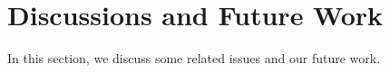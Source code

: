 \section{Discussions and Future Work}
\label{sec:discussion}

In this section, we discuss some related issues and our future work.

\begin{comment}
\vspace{1mm}\noindent{\textbf{Scalability.}} The adversary cannot exhaust $ID_{RP}$ and $PID_{RP}$.
For $ID_{RP}$, it is generated only in RP's initial registration.
For $PID_{RP}$,  in practice, we only need to ensure all $PID_{RP}$s are different among the unexpired identity proof (the number denoted as $a$). We assume that IdP doesn't perform the uniqueness check, and then calculate the probability that at least two $PID_{RP}$s are equal in these $a$ ones. The probability is $1-\prod_{i=0}^{a-1}(1-i/q)$ which increases with $a$.
For an IdP with throughput $2*10^8$ req/s, when the validity period of the identity proof ($PID_{RP}$) is set as 5 minutes, $a$ is less than $2^{36}$, then the probability is less than $2^{-183}$ for 256-bit $q$ (the order of base point $G$ on $P-256$).
Moreover, as this probability is negligible, the uniqueness check of $PID_{RP}$, i.e., the $PID_{RP}$ registration, could be removed in the SSO login process, and this optimization can be adopted when this negligible probability is acceptable by the users and RPs.

\noindent{\textbf{Security against DoS attack.}}
The adversary may attempt to perform DoS attack on the IdP and RP. For example, the adversary may act as a user to invoke the $PID_{RP}$ registration (Step 3.1) and identity proof generation (Step 4.3) at the IdP, which requires the IdP to perform two signature generations and one modular exponentiation.
However, as the user has already been authenticated at the IdP, the IdP could identify the malicious users based on audit, in addition to the existing DoS mitigation schemes.
\end{comment}

